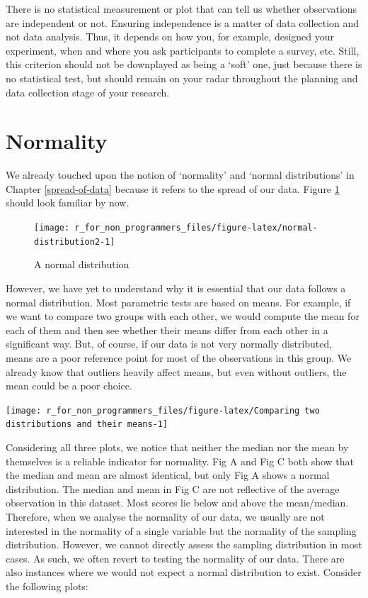 \documentclass[
]{book}
\begin{document}
There is no statistical measurement or plot that can tell us whether observations are independent or not. Ensuring independence is a matter of data collection and not data analysis. Thus, it depends on how you, for example, designed your experiment, when and where you ask participants to complete a survey, etc. Still, this criterion should not be downplayed as being a `soft' one, just because there is no statistical test, but should remain on your radar throughout the planning and data collection stage of your research.

\hypertarget{normality}{%
\section{Normality}\label{normality}}

We already touched upon the notion of `normality' and `normal distributions' in Chapter \ref{spread-of-data} because it refers to the spread of our data. Figure \ref{fig:normal-distribution2} should look familiar by now.

\begin{figure}

{\centering \texttt{[image: r\_for\_non\_programmers\_files/figure-latex/normal-distribution2-1]} 

}

\caption{A normal distribution}\label{fig:normal-distribution2}
\end{figure}

However, we have yet to understand why it is essential that our data follows a normal distribution. Most parametric tests are based on means. For example, if we want to compare two groups with each other, we would compute the mean for each of them and then see whether their means differ from each other in a significant way. But, of course, if our data is not very normally distributed, means are a poor reference point for most of the observations in this group. We already know that outliers heavily affect means, but even without outliers, the mean could be a poor choice.

\begin{center}\texttt{[image: r\_for\_non\_programmers\_files/figure-latex/Comparing two distributions and their means-1]} \end{center}

Considering all three plots, we notice that neither the median nor the mean by themselves is a reliable indicator for normality. Fig A and Fig C both show that the median and mean are almost identical, but only Fig A shows a normal distribution. The median and mean in Fig C are not reflective of the average observation in this dataset. Most scores lie below and above the mean/median. Therefore, when we analyse the normality of our data, we usually are not interested in the normality of a single variable but the normality of the sampling distribution. However, we cannot directly assess the sampling distribution in most cases. As such, we often revert to testing the normality of our data. There are also instances where we would not expect a normal distribution to exist. Consider the following plots:
\end{document}
